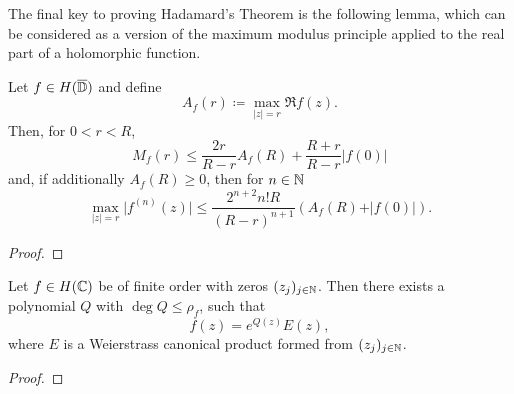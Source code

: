 The final key to proving Hadamard's Theorem is the following lemma, which can be considered as a version of the maximum modulus principle applied to the real part of a holomorphic function.

\begin{lemma} \label{lem:borel-caratheodory}
    Let $f \in H(\overline{\mathbb{D}})$ and define
    $$ A_f(r) \coloneqq \max_{\vert z \vert = r} \Re f(z). $$
    Then, for $0 < r < R$,
    $$ M_f(r) \leq \frac{2r}{R - r} A_f(R) + \frac{R + r}{R - r} \vert f(0) \vert $$
    and, if additionally $A_f(R) \geq 0$, then for $n \in \mathbb{N}$
    $$ \max_{\vert z \vert = r} \vert f^{(n)}(z) \vert \leq \frac{2^{n+2} n! R}{(R - r)^{n+1}} (A_f(R) + \vert f(0) \vert). $$
\end{lemma}

\begin{proof}
\end{proof}

\begin{theorem}[Hadamard] \label{thm:hadamard}
    Let $f \in H(\mathbb{C})$ be of finite order with zeros $(z_j)_{j \in \mathbb{N}}$. Then there exists a polynomial $Q$ with $\deg Q \leq \rho_f$, such that
    $$ f(z) = e^{Q(z)} E(z), $$
    where $E$ is a Weierstrass canonical product formed from $(z_j)_{j \in \mathbb{N}}$.
\end{theorem}

\begin{proof}
\end{proof}